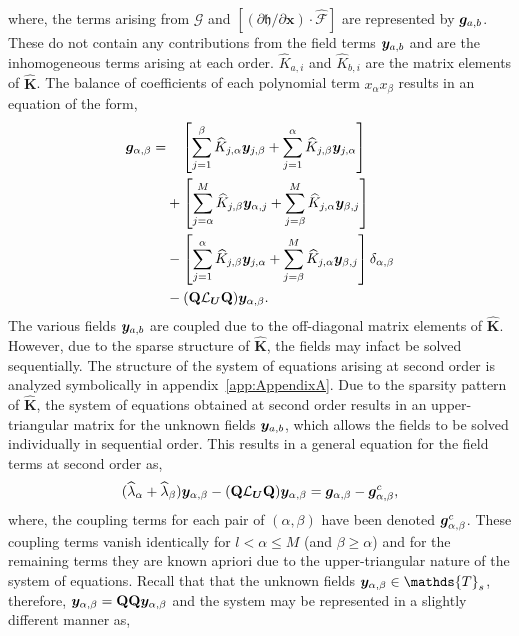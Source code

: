 where, the terms arising from $\mathcal{G}$ and $[(\partial \mathfrak{h}/\partial \mathbf{x})\cdot \mathcal{\widehat{F}}]$ are represented by $\boldsymbol{g}_{a,b}$. These do not contain any contributions from the field terms $\boldsymbol{y}_{a,b}$ and are the inhomogeneous terms arising at each order.  $\widehat{K}_{a,i}$ and $\widehat{K}_{b,i}$ are the matrix elements of $\mathbf{\widehat{K}}$. The balance of coefficients of each polynomial term $x_{\alpha}x_{\beta}$ results in an equation of the form,
\begin{align}
	\label{eqn:second_order_alpha_beta_terms}
	\begin{split}
		 \boldsymbol{g}_{\alpha,\beta} =& \ \ \ \left[\sum_{j=1}^{\beta}\widehat{K}_{j,\alpha}\boldsymbol{y}_{j,\beta} + \sum_{j=1}^{\alpha}\widehat{K}_{j,\beta}\boldsymbol{y}_{j,\alpha} \right] \\
		& + \left[\sum_{j=\alpha}^{M}\widehat{K}_{j,\beta}\boldsymbol{y}_{\alpha,j} + \sum_{j=\beta}^{M}\widehat{K}_{j,\alpha}\boldsymbol{y}_{\beta,j} \right] \\
		& - \left[\sum_{j=1}^{\alpha}\widehat{K}_{j,\beta}\boldsymbol{y}_{j,\alpha} + \sum_{j=\beta}^{M}\widehat{K}_{j,\alpha}\boldsymbol{y}_{\beta,j} \right]\delta_{\alpha,\beta} \\
		& - (\mathbf{Q}\mathcal{L}_{\boldsymbol{U}}\mathbf{Q})\boldsymbol{y}_{\alpha,\beta}.
	\end{split}
\end{align}
The various fields $\boldsymbol{y}_{a,b}$ are coupled due to the off-diagonal matrix elements of $\mathbf{\widehat{K}}$. However, due to the sparse structure of $\mathbf{\widehat{K}}$, the fields may infact be solved sequentially. The structure of the system of equations arising at second order is analyzed symbolically in appendix~\ref{app:AppendixA}. Due to the sparsity pattern of $\mathbf{\widehat{K}}$, the system of equations obtained at second order results in an upper-triangular matrix for the unknown fields $\boldsymbol{y}_{a,b}$, which allows the fields to be solved individually in sequential order. This results in a general equation for the field terms at second order as,
\begin{align}
	(\widehat{\lambda}_{\alpha} + \widehat{\lambda}_{\beta})\boldsymbol{y}_{\alpha,\beta} 
	- (\mathbf{Q}\mathcal{L}_{\boldsymbol{U}}\mathbf{Q})\boldsymbol{y}_{\alpha,\beta} = \boldsymbol{g}_{\alpha,\beta} - \boldsymbol{g}^{c}_{\alpha,\beta}, \nonumber
\end{align}
where, the coupling terms for each pair of $(\alpha,\beta)$ have been denoted $\boldsymbol{g}^{c}_{\alpha,\beta}$. These coupling terms vanish identically for $l < \alpha \le M$ (and $\beta\ge\alpha$) and for the remaining terms they are known apriori due to the upper-triangular nature of the system of equations. Recall that that the unknown fields $\vfield{y}_{\alpha,\beta}\in\mathds{T}_{s}$, therefore, $\boldsymbol{y}_{\alpha,\beta} = \mathbf{Q}\mathbf{Q}\boldsymbol{y}_{\alpha,\beta}$  and the system may be represented in a slightly different manner as, 
